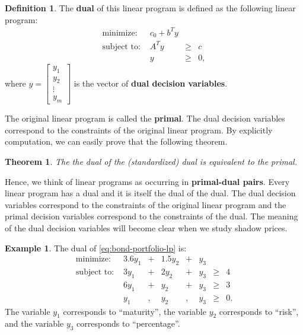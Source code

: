 \documentclass[
]{book}
\newtheorem{theorem}{Theorem}[chapter]
\theoremstyle{definition}
\newtheorem{definition}{Definition}[chapter]
\theoremstyle{definition}
\newtheorem{example}{Example}[chapter]
\theoremstyle{definition}
\theoremstyle{definition}
\theoremstyle{remark}
\begin{document}
\begin{definition}
The \textbf{dual} of this linear program is defined as the following linear program:
\begin{equation}
  \begin{array}{lrll}
    \mbox{minimize: } & c_0 + b^T y \\
    \mbox{subject to: } 
      & A^T y & \geq & c \\
      & y & \geq & 0,
  \end{array}
  \label{eq:standard-dual-lp}
\end{equation}
where \(y = \begin{bmatrix} y_1 \\ y_2 \\ \vdots \\ y_m \end{bmatrix}\) is the vector of \textbf{dual decision variables}.
\end{definition}

The original linear program is called the \textbf{primal}. The dual decision variables correspond to the constraints of the original linear program. By explicitly computation, we can easily prove that the following theorem.

\begin{theorem}
The the dual of the (standardized) dual is equivalent to the primal.
\end{theorem}

Hence, we think of linear programs as occurring in \textbf{primal-dual pairs}.
Every linear program has a dual and it is itself the dual of the dual.
The dual decision variables correspond to the constraints of the original linear program and the primal decision variables correspond to the constraints of the dual.
The meaning of the dual decision variables will become clear when we study shadow prices.

\begin{example}
The dual of \eqref{eq:bond-portfolio-lp} is:
\begin{equation}
\begin{array}{lrrrrrrrrrr}
  \mbox{minimize: } 
    & 3.6 y_1 & + & 1.5 y_2 & + & y_3 \\
  \mbox{subject to: }
    & 3y_1 & + & 2 y_2 & + & y_3 & \geq & 4 \\
    & 6y_1 & + & y_2 & + & y_3 & \geq & 3 \\
    & y_1 & , & y_2 & , & y_3 & \geq & 0.
\end{array}
\label{eq:bond-portfolio-dual}
\end{equation}
The variable \(y_1\) corresponds to ``maturity'', the variable \(y_2\) corresponds to ``risk'', and the variable \(y_3\) corresponds to ``percentage''.
\end{example}
\end{document}
